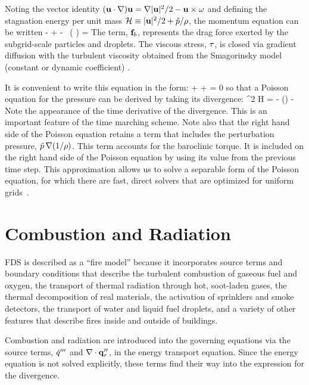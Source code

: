 Noting the vector identity $({\bf u} \cdot \nabla) {\bf u} = \nabla|{\bf u}|^2/2 - {\bf u}\times{\bf \omega} $ and defining the stagnation energy per unit mass ${\cal H} \equiv |{\bf u}|^2/2 + \tilde{p}/\rho$, the momentum equation can be written
\be {} - \bu\times\bo +  - \tp \, \nabla \left( \right) =    \label{momeq} \ee
The term, ${\bf f}_b$, represents the drag force exerted by the subgrid-scale particles and droplets. The viscous stress, ${\bf \tau}$, is closed via gradient diffusion with the turbulent viscosity obtained from the Smagorinsky model (constant or dynamic coefficient) \cite{Germano:1991,Moin:1991,Smagorinsky:1}.

It is convenient to write this equation in the form:
\be {} + \bF + \nabla \cH = 0 \label{simple_momentum_equation} \ee
so that a Poisson equation for the pressure can be derived by taking its divergence:
\be \nabla^2 {\cal H} = - (\nabla\!\cdot \bu) - \nabla\!\cdot \bF    \label{simplephi2} \ee
Note the appearance of the time derivative of the divergence. This is an important feature of the time marching scheme. Note also that the right hand side of the Poisson equation retains a term that includes the perturbation pressure, $\tilde{p} \, \nabla (1/\rho)$. This term accounts for the baroclinic torque. It is included on the right hand side of the Poisson equation by using its value from the previous time step. This approximation allows us to solve a separable form of the Poisson equation, for which there are fast, direct solvers that are optimized for uniform grids~\cite{Sweet:1}.

\section{Combustion and Radiation}

FDS is described as a ``fire model'' because it incorporates source terms and boundary conditions that describe the
turbulent combustion of gaseous fuel and oxygen, the transport of thermal radiation through hot, soot-laden gases, the
thermal decomposition of real materials, the activation of sprinklers and smoke detectors, the transport of water and liquid fuel
droplets, and a variety of other features that describe fires inside and outside of buildings.

Combustion and radiation are introduced into the governing equations via the source terms, $\dot{q}'''$ and $\nabla \cdot {\bf q}_r''$,
in the energy transport equation. Since the energy equation is not solved explicitly, these terms find their way into the
expression for the divergence.

